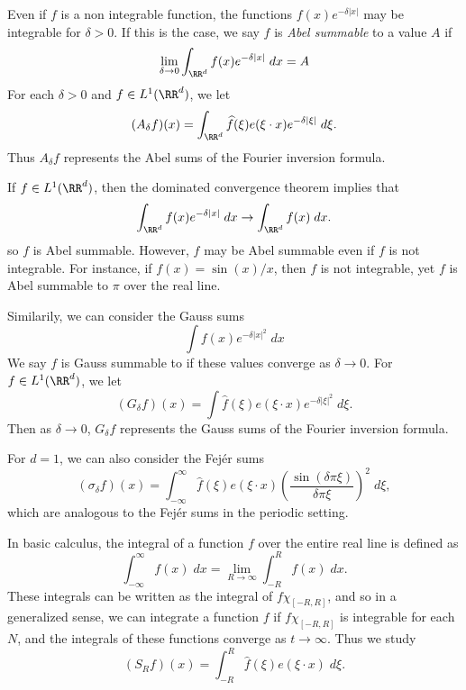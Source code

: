 \begin{example}
    Even if $f$ is a non integrable function, the functions $f(x) e^{-\delta |x|}$ may be integrable for $\delta > 0$. If this is the case, we say $f$ is \emph{Abel summable} to a value $A$ if
    \[ \lim_{\delta \to 0} \int_{\RR^d} f(x) e^{-\delta |x|}\; dx = A \]
    For each $\delta > 0$ and $f \in L^1(\RR^d)$, we let
    \[ (A_\delta f)(x) = \int_{\RR^d} \widehat{f}(\xi) e(\xi \cdot x) e^{-\delta |\xi|}\; d\xi. \]
    Thus $A_\delta f$ represents the Abel sums of the Fourier inversion formula.
\end{example}

If $f \in L^1(\RR^d)$, then the dominated convergence theorem implies that
%
\[ \int_{\RR^d} f(x) e^{-\delta |x|}\; dx \to \int_{\RR^d} f(x)\; dx. \]
%
so $f$ is Abel summable. However, $f$ may be Abel summable even if $f$ is not integrable. For instance, if $f(x) = \sin(x)/x$, then $f$ is not integrable, yet $f$ is Abel summable to $\pi$ over the real line.

\begin{example}
    Similarily, we can consider the Gauss sums
    \[ \int f(x) e^{-\delta |x|^2}\; dx \]
    We say $f$ is Gauss summable to if these values converge as $\delta \to 0$. For $f \in L^1(\RR^d)$, we let
    \[ (G_\delta f)(x) = \int \widehat{f}(\xi) e(\xi \cdot x) e^{-\delta |\xi|^2}\; d\xi. \]
    Then as $\delta \to 0$, $G_\delta f$ represents the Gauss sums of the Fourier inversion formula.
\end{example}

\begin{example}
    For $d = 1$, we can also consider the Fej\'{e}r sums
    \[ (\sigma_\delta f)(x) = \int_{-\infty}^\infty \widehat{f}(\xi) e(\xi \cdot x) \left( \frac{\sin(\delta \pi \xi)}{\delta \pi \xi} \right)^2\; d\xi, \]
    which are analogous to the Fej\'{e}r sums in the periodic setting.
\end{example}

\begin{example}
    In basic calculus, the integral of a function $f$ over the entire real line is defined as
    \[ \int_{-\infty}^\infty f(x)\; dx = \lim_{R \to \infty} \int_{-R}^R f(x)\; dx. \]
    These integrals can be written as the integral of $f \chi_{[-R,R]}$, and so in a generalized sense, we can integrate a function $f$ if $f \chi_{[-R,R]}$ is integrable for each $N$, and the integrals of these functions converge as $t \to \infty$. Thus we study
    \[ (S_R f)(x) = \int_{-R}^R \widehat{f}(\xi) e(\xi \cdot x)\; d\xi. \]
\end{example}

